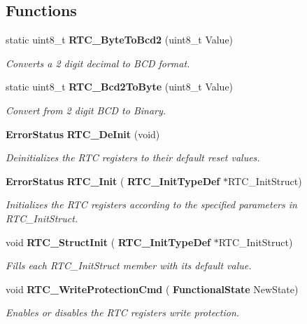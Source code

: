 \subsection*{Functions}
\begin{DoxyCompactItemize}
\item 
static uint8\+\_\+t \textbf{ R\+T\+C\+\_\+\+Byte\+To\+Bcd2} (uint8\+\_\+t Value)
\begin{DoxyCompactList}\small\item\em Converts a 2 digit decimal to B\+CD format. \end{DoxyCompactList}\item 
static uint8\+\_\+t \textbf{ R\+T\+C\+\_\+\+Bcd2\+To\+Byte} (uint8\+\_\+t Value)
\begin{DoxyCompactList}\small\item\em Convert from 2 digit B\+CD to Binary. \end{DoxyCompactList}\item 
\textbf{ Error\+Status} \textbf{ R\+T\+C\+\_\+\+De\+Init} (void)
\begin{DoxyCompactList}\small\item\em Deinitializes the R\+TC registers to their default reset values. \end{DoxyCompactList}\item 
\textbf{ Error\+Status} \textbf{ R\+T\+C\+\_\+\+Init} (\textbf{ R\+T\+C\+\_\+\+Init\+Type\+Def} $\ast$R\+T\+C\+\_\+\+Init\+Struct)
\begin{DoxyCompactList}\small\item\em Initializes the R\+TC registers according to the specified parameters in R\+T\+C\+\_\+\+Init\+Struct. \end{DoxyCompactList}\item 
void \textbf{ R\+T\+C\+\_\+\+Struct\+Init} (\textbf{ R\+T\+C\+\_\+\+Init\+Type\+Def} $\ast$R\+T\+C\+\_\+\+Init\+Struct)
\begin{DoxyCompactList}\small\item\em Fills each R\+T\+C\+\_\+\+Init\+Struct member with its default value. \end{DoxyCompactList}\item 
void \textbf{ R\+T\+C\+\_\+\+Write\+Protection\+Cmd} (\textbf{ Functional\+State} New\+State)
\begin{DoxyCompactList}\small\item\em Enables or disables the R\+TC registers write protection. \end{DoxyCompactList}\item 

\end{DoxyCompactItemize}
